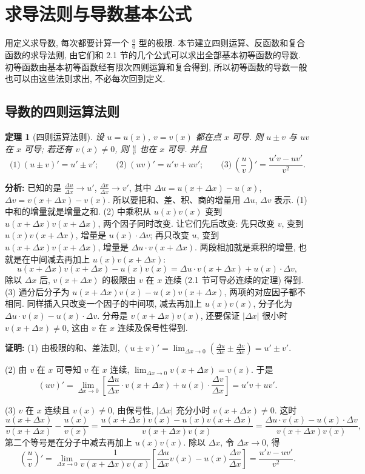 \documentclass[UTF8,openany]{ctexbook}
\theoremstyle{chinesetextbook}
\newtheorem{theorem}{定理}[section]
\newenvironment{cnproof}{\par\indent\textbf{证明:} \ignorespaces}{\par}
\begin{document}
\section{求导法则与导数基本公式}
用定义求导数, 每次都要计算一个 $\displaystyle\frac00$ 型的极限. 本节建立四则运算、反函数和复合函数的求导法则, 由它们和 2.1 节的几个公式可以求出全部基本初等函数的导数. 初等函数由基本初等函数经有限次四则运算和复合得到, 所以初等函数的导数一般也可以由这些法则求出, 不必每次回到定义.
\subsection{导数的四则运算法则}
\begin{theorem}[四则运算法则]\label{thm:c2-2-arith}
设 $u=u(x)$, $v=v(x)$ 都在点 $x$ 可导. 则 $u\pm v$ 与 $uv$ 在 $x$ 可导; 若还有 $v(x)\ne0$, 则 $\displaystyle\frac uv$ 也在 $x$ 可导. 并且
\[
\text{(1)}\ (u\pm v)'=u'\pm v';\qquad\text{(2)}\ (uv)'=u'v+uv';\qquad\text{(3)}\ \left(\frac uv\right)'=\frac{u'v-uv'}{v^2}.
\]
\end{theorem}
\par\indent\textbf{分析:} 已知的是 $\displaystyle\frac{\Delta u}{\Delta x}\to u'$, $\displaystyle\frac{\Delta v}{\Delta x}\to v'$, 其中 $\Delta u=u(x+\Delta x)-u(x)$, $\Delta v=v(x+\Delta x)-v(x)$. 所以要把和、差、积、商的增量用 $\Delta u$, $\Delta v$ 表示. (1) 中和的增量就是增量之和. (2) 中乘积从 $u(x)v(x)$ 变到 $u(x+\Delta x)v(x+\Delta x)$, 两个因子同时改变. 让它们先后改变: 先只改变 $v$, 变到 $u(x)v(x+\Delta x)$, 增量是 $u(x)\cdot\Delta v$; 再只改变 $u$, 变到 $u(x+\Delta x)v(x+\Delta x)$, 增量是 $\Delta u\cdot v(x+\Delta x)$. 两段相加就是乘积的增量, 也就是在中间减去再加上 $u(x)v(x+\Delta x)$:
\[
u(x+\Delta x)v(x+\Delta x)-u(x)v(x)=\Delta u\cdot v(x+\Delta x)+u(x)\cdot\Delta v,
\]
除以 $\Delta x$ 后, $v(x+\Delta x)$ 的极限由 $v$ 在 $x$ 连续 (2.1 节可导必连续的定理) 得到. (3) 通分后分子为 $u(x+\Delta x)v(x)-u(x)v(x+\Delta x)$, 两项的对应因子都不相同. 同样插入只改变一个因子的中间项, 减去再加上 $u(x)v(x)$, 分子化为 $\Delta u\cdot v(x)-u(x)\cdot\Delta v$. 分母是 $v(x+\Delta x)v(x)$, 还要保证 $|\Delta x|$ 很小时 $v(x+\Delta x)\ne0$, 这由 $v$ 在 $x$ 连续及保号性得到.
\begin{cnproof}
(1) 由极限的和、差法则, $\displaystyle(u\pm v)'=\lim_{\Delta x\to0}\left(\frac{\Delta u}{\Delta x}\pm\frac{\Delta v}{\Delta x}\right)=u'\pm v'$.

(2) 由 $v$ 在 $x$ 可导知 $v$ 在 $x$ 连续, $\displaystyle\lim_{\Delta x\to0}v(x+\Delta x)=v(x)$. 于是
\[
(uv)'=\lim_{\Delta x\to0}\left[\frac{\Delta u}{\Delta x}\cdot v(x+\Delta x)+u(x)\cdot\frac{\Delta v}{\Delta x}\right]=u'v+uv'.
\]

(3) $v$ 在 $x$ 连续且 $v(x)\ne0$, 由保号性, $|\Delta x|$ 充分小时 $v(x+\Delta x)\ne0$. 这时
\[
\frac{u(x+\Delta x)}{v(x+\Delta x)}-\frac{u(x)}{v(x)}=\frac{u(x+\Delta x)v(x)-u(x)v(x+\Delta x)}{v(x+\Delta x)v(x)}=\frac{\Delta u\cdot v(x)-u(x)\cdot\Delta v}{v(x+\Delta x)v(x)},
\]
第二个等号是在分子中减去再加上 $u(x)v(x)$. 除以 $\Delta x$, 令 $\Delta x\to0$, 得
\[
\left(\frac uv\right)'=\lim_{\Delta x\to0}\frac1{v(x+\Delta x)v(x)}\left[\frac{\Delta u}{\Delta x}v(x)-u(x)\frac{\Delta v}{\Delta x}\right]=\frac{u'v-uv'}{v^2}.
\]
\end{cnproof}
\end{document}
